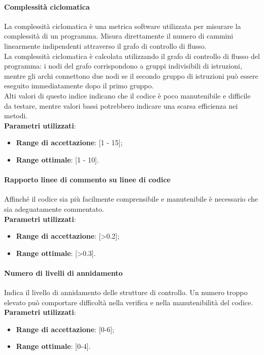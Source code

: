\documentclass[12pt,a4paper,titlepage]{article}
\begin{document}
			\paragraph{Complessità ciclomatica}
			La complessità ciclomatica è una metrica software utilizzata per misurare la complessità di un programma. Misura direttamente il numero di cammini linearmente indipendenti attraverso il grafo di controllo di flusso.\\
			La complessità ciclomatica è calcolata utilizzando il grafo di controllo di flusso del programma: i nodi del grafo corrispondono a gruppi indivisibili di istruzioni, mentre gli archi connettono due nodi se il secondo gruppo di istruzioni può essere eseguito immediatamente dopo il primo gruppo.\\
			Alti valori di questo indice indicano che il codice è poco manutenibile e difficile da testare, mentre valori bassi potrebbero indicare una scarsa efficienza nei metodi.\\
			\textbf{Parametri utilizzati}:
			\begin{itemize}
				\item \textbf{Range di accettazione}: [1 - 15];
				\item \textbf{Range ottimale}: [1 - 10].
			\end{itemize}
		
			\paragraph{Rapporto linee di commento su linee di codice}
			Affinché il codice sia più facilmente comprensibile e manutenibile è necessario che sia adeguatamente commentato.\\
			\textbf{Parametri utilizzati}:
			\begin{itemize}
				\item \textbf{Range di accettazione}: [>0.2];
				\item \textbf{Range ottimale}: [>0.3].
			\end{itemize}
		
			\paragraph{Numero di livelli di annidamento}
			Indica il livello di annidamento delle strutture di controllo. Un numero troppo elevato può comportare difficoltà nella verifica e nella manutenibilità del codice.\\
			\textbf{Parametri utilizzati}:
			\begin{itemize}
				\item \textbf{Range di accettazione}: [0-6];
				\item \textbf{Range ottimale}: [0-4].
			\end{itemize}
		
\end{document}
